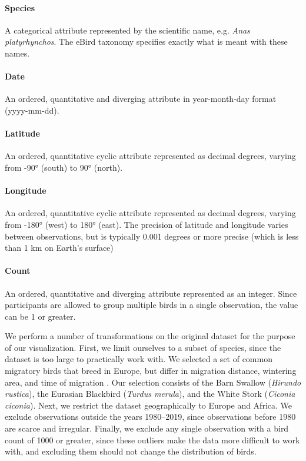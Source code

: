 \documentclass[journal]{vgtc}                %
\begin{document}
\paragraph{Species} A categorical attribute represented by the scientific name, e.g. \textit{Anas platyrhynchos}. The eBird taxonomy\cite{ebird2019taxonomy} specifies exactly what is meant with these names.

\paragraph{Date} An ordered, quantitative and diverging attribute in year-month-day format (yyyy-mm-dd).

\paragraph{Latitude} An ordered, quantitative cyclic attribute represented as decimal degrees, varying from -90° (south) to 90° (north).

\paragraph{Longitude} An ordered, quantitative cyclic attribute represented as decimal degrees, varying from -180° (west) to 180° (east). The precision of latitude and longitude varies between observations, but is typically 0.001 degrees or more precise (which is less than 1 km on Earth's surface)

\paragraph{Count} An ordered, quantitative and diverging attribute represented as an integer. Since participants are allowed to group multiple birds in a single observation, the value can be 1 or greater.

\vspace{2mm}

We perform a number of transformations on the original dataset for the purpose of our visualization. First, we limit ourselves to a subset of species, since the dataset is too large to practically work with. We selected a set of common migratory birds that breed in Europe, but differ in migration distance, wintering area, and time of migration \cite{turner1989swallow,jenni2003timing}. Our selection consists of the Barn Swallow (\emph{Hirundo rustica}), the Eurasian Blackbird (\emph{Turdus merula}), and the White Stork (\emph{Ciconia ciconia}). Next, we restrict the dataset geographically to Europe and Africa. We exclude observations outside the years 1980--2019, since observations before 1980 are scarce and irregular. Finally, we exclude any single observation with a bird count of 1000 or greater, since these outliers make the data more difficult to work with, and excluding them should not change the distribution of birds.
\end{document}
